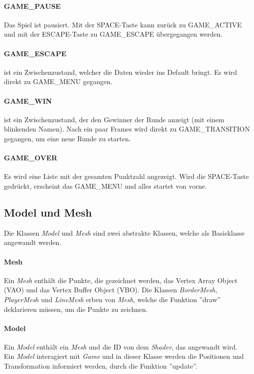 \documentclass[doktyp=studarbeit]{TUBAFarbeiten}
\begin{document}
\paragraph{GAME\_PAUSE}
Das Spiel ist pausiert. Mit der SPACE-Taste kann zurück zu GAME\_ACTIVE 
und mit der ESCAPE-Taste zu GAME\_ESCAPE übergegangen werden.
\paragraph{GAME\_ESCAPE}
ist ein Zwischenzustand, welcher die Daten wieder ins Default 
bringt. Es wird direkt zu GAME\_MENU gegangen.
\paragraph{GAME\_WIN}
ist ein Zwischenzustand, der den Gewinner der Runde anzeigt 
(mit einem blinkenden Namen).
Nach ein paar Frames wird direkt zu GAME\_TRANSITION gegangen, um eine 
neue Runde zu starten. 
\paragraph{GAME\_OVER}
Es wird eine Liste mit der gesamten Punktzahl angezeigt. Wird die SPACE-Taste
gedrückt, erscheint das GAME\_MENU und alles startet von vorne.

\subsection{Model und Mesh}
Die Klassen \textit{Model} und \textit{Mesh} sind zwei abstrakte Klassen, welche
als Basisklasse angewandt werden.

\paragraph{Mesh} 
Ein \textit{Mesh} enthält die Punkte, die gezeichnet werden, das 
Vertex Array Object (VAO) und das Vertex Buffer Object (VBO). 
Die Klassen \textit{BorderMesh}, \textit{PlayerMesh} und \textit{LineMesh} 
erben von \textit{Mesh}, welche die Funktion ''draw'' deklarieren müssen,
um die Punkte zu zeichnen.

\paragraph{Model} 
Ein \textit{Model} enthält ein \textit{Mesh} und die ID von dem \textit{Shader},
das angewandt wird. Ein \textit{Model} interagiert mit \textit{Game} und in
dieser Klasse werden die Positionen und Transformation informiert werden, 
durch die Funktion ''update''.
\end{document}
